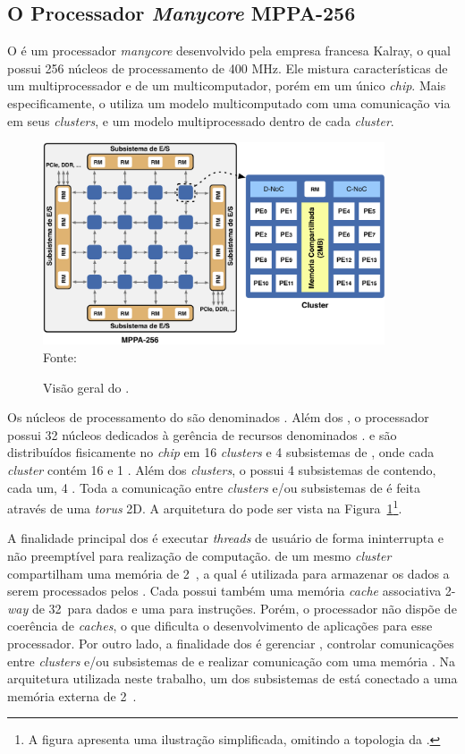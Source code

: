 \subsection{O Processador \textit{Manycore} MPPA-256}
\label{sec:mppa}

O \mppa é um processador \textit{manycore} desenvolvido pela empresa francesa
Kalray, o qual possui 256 núcleos de processamento de 400 MHz. Ele mistura características
de um multiprocessador e de um multicomputador, porém em um único \textit{chip}.
Mais especificamente, o \mppa utiliza um modelo multicomputado com uma
comunicação via \noc em seus \textit{clusters}, e um modelo multiprocessado
dentro de cada \textit{cluster}.

\begin{figure}[t]
	\centering
	\caption{Visão geral do \mppa.}
	\includegraphics[width=0.9\textwidth]{figs/mppa-overall.pdf} \\
    Fonte:~\cite{Castro-IA3:2013}
	\label{fig:mppa}
\end{figure}

Os núcleos de processamento do \mppa são denominados \pes.
Além dos \pes, o processador possui 32 núcleos dedicados à gerência de recursos
denominados  \rmans. \pes e \rmans são distribuídos
fisicamente no \textit{chip} em 16 \textit{clusters} e 4 subsistemas de \es,
onde cada \textit{cluster} contém 16 \pes e 1 \rman. Além dos \textit{clusters}, o
\mppa possui 4 subsistemas de \es contendo, cada um, 4 \rmans. Toda a comunicação
entre \textit{clusters} e/ou subsistemas de \es é feita através de uma \noc
\textit{torus} 2D. A arquitetura do \mppa pode ser vista na
Figura~\ref{fig:mppa}\footnote{A figura apresenta uma ilustração simplificada,
    omitindo a topologia da \noc.}.

A finalidade principal dos \pes é executar \textit{threads} de usuário de forma
ininterrupta e não preemptível para realização de computação. \pes de um mesmo
\textit{cluster} compartilham uma memória de 2~\mb, a qual é utilizada para
armazenar os dados a serem processados pelos \pes. Cada \pe possui também uma
memória \textit{cache} associativa 2-\textit{way} de 32~\kb para dados e uma para
instruções. Porém, o processador não dispõe de coerência de \textit{caches}, o
que dificulta o desenvolvimento de aplicações para esse processador. Por outro
lado, a finalidade dos \rmans é gerenciar \es, controlar comunicações entre
\textit{clusters} e/ou subsistemas de \es e realizar comunicação com uma memória
\ram. Na arquitetura utilizada neste trabalho, um dos subsistemas de \es está conectado a uma
memória externa \lpddr de 2~\gb.


